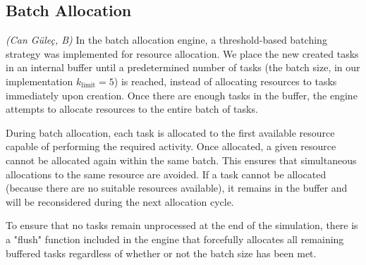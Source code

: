 \subsection{Batch Allocation}\label{subsec:batch}
\textit{(Can Güleç, B)}\quad
In the batch allocation engine, a threshold-based batching strategy was implemented for resource allocation. We place the new created tasks in an internal buffer until a predetermined number of tasks (the batch size, in our implementation $k_{\text{limit}} = 5$) is reached, instead of allocating resources to tasks immediately upon creation. Once there are enough tasks in the buffer, the engine attempts to allocate resources to the entire batch of tasks.

During batch allocation, each task is allocated to the first available resource capable of performing the required activity. Once allocated, a given resource cannot be allocated again within the same batch. This ensures that simultaneous allocations to the same resource are avoided. If a task cannot be allocated (because there are no suitable resources available), it remains in the buffer and will be reconsidered during the next allocation cycle.

To ensure that no tasks remain unprocessed at the end of the simulation, there is a "flush" function included in the engine that forcefully allocates all remaining buffered tasks regardless of whether or not the batch size has been met.